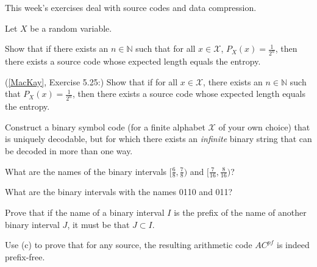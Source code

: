 \documentclass[a4paper,10pt,landscape,twocolumn]{scrartcl}
\begin{document}
\practiceproblems

{\sffamily\noindent
This week's exercises deal with source codes and data compression. \practiceinstructions
}

\begin{exercise}
Let $X$ be a random variable.
	\begin{subex}
	Show that if there exists an $n \in \mathbb{N}$ such that for all $x \in \mathcal{X}$, $P_X(x) = \frac{1}{2^n}$, then there exists a source code whose expected length equals the entropy.
	\end{subex}
	\begin{subex}
	(\href{http://www.inference.phy.cam.ac.uk/mackay/itila/book.html}{[MacKay]}, Exercise 5.25:) Show that if for all $x \in \mathcal{X}$, there exists an $n \in \mathbb{N}$ such that $P_X(x) = \frac{1}{2^n}$, then there exists a source code whose expected length equals the entropy.
	\end{subex}
\end{exercise}

\begin{bonusexercise}
Construct a binary symbol code (for a finite alphabet $\mathcal{X}$ of your own choice) that is uniquely decodable, but for which there exists an \emph{infinite} binary string that can be decoded in more than one way.
\end{bonusexercise}




\begin{exercise}
	\begin{subex}
	What are the names of the binary intervals $[\frac{6}{8},\frac{7}{8})$ and $[\frac{7}{16},\frac{8}{16})$?
	\end{subex}
	\begin{subex}
	What are the binary intervals with the names 0110 and 011?
	\end{subex}
	\begin{subex}
	Prove that if the name of a binary interval $I$ is the prefix of the name of another binary interval $J$, it must be that $J \subset I$.
	\end{subex}
	\begin{subex}
	Use (c) to prove that for any source, the resulting arithmetic code $AC^{pf}$ is indeed prefix-free.
	\end{subex}
\end{exercise}
\end{document}
